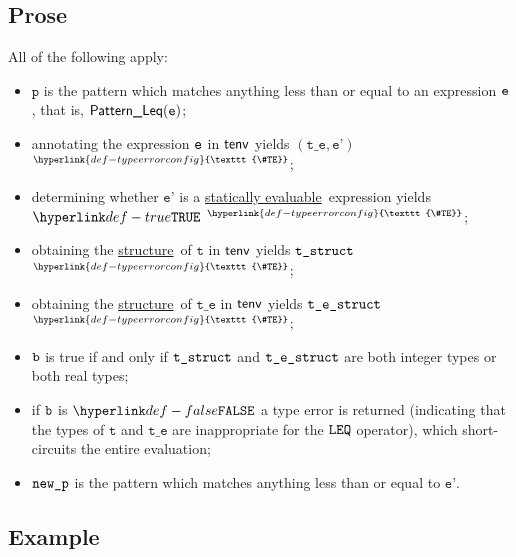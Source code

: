 \documentclass{book}
\newcommand\TypeErrorConfig[0]{\hyperlink{def-typeerrorconfig}{\texttt{\#TE}}}
\newcommand\ProseOrTypeError[0]{\hyperlink{def-proseortypeerror}{$^{\TypeErrorConfig}$}}
\newcommand\structure[0]{\hyperlink{def-structure}{structure}}
\newcommand\staticallyevaluable[0]{\hyperlink{def-staticallyevaluable}{statically evaluable}}
\newcommand\vp[0]{\texttt{p}}
\newcommand\vt[0]{\texttt{t}}
\newcommand\vte[0]{\texttt{t\_e}}
\newcommand\vep[0]{\texttt{e'}}
\begin{document}
\subsection{Prose}
All of the following apply:
\begin{itemize}
\item $\vp$ is the pattern which matches anything less than or equal to an expression $\texttt{e}$,
that is, $\textsf{Pattern\_Leq}(\texttt{e})$;
\item annotating the expression $\texttt{e}$ in $\textsf{tenv}$ yields $(\vte, \vep)$ \ProseOrTypeError;
\item determining whether $\vep$ is a \staticallyevaluable\ expression yields $\True$ \ProseOrTypeError;
\item obtaining the \structure\ of $\vt$ in $\textsf{tenv}$ yields $\texttt{t\_struct}$ \ProseOrTypeError;
\item obtaining the \structure\ of $\vte$ in $\textsf{tenv}$ yields $\texttt{t\_e\_struct}$ \ProseOrTypeError;
\item $\texttt{b}$ is true if and only if $\texttt{t\_struct}$ and $\texttt{t\_e\_struct}$ are both integer types or both real types;
\item if $\texttt{b}$ is $\False$ a type error is returned (indicating that the types of $\vt$ and $\vte$
      are inappropriate for the $\texttt{LEQ}$ operator),
which short-circuits the entire evaluation;
\item $\texttt{new\_p}$ is the pattern which matches anything less than or equal to $\vep$.
\end{itemize}

\subsection{Example}

\end{document}
